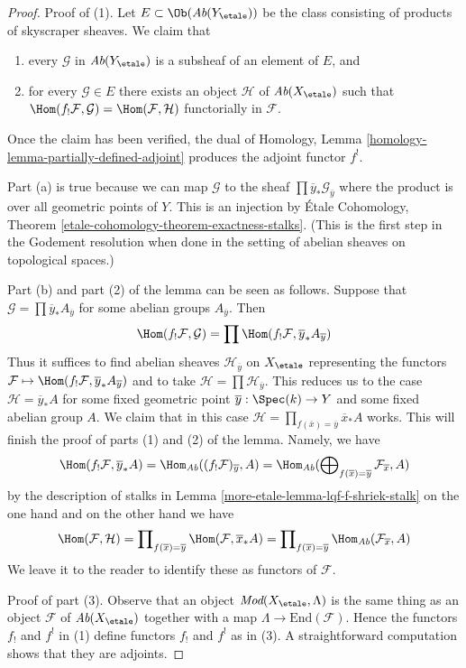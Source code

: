 \begin{proof}
Proof of (1). Let $E \subset \Ob(\textit{Ab}(Y_\etale))$ be the class
consisting of products of skyscraper sheaves. We claim that
\begin{enumerate}
\item[(a)] every $\mathcal{G}$ in $\textit{Ab}(Y_\etale)$ is a subsheaf
of an element of $E$, and
\item[(b)] for every $\mathcal{G} \in E$ there exists an object
$\mathcal{H}$ of $\textit{Ab}(X_\etale)$ such that
$\Hom(f_!\mathcal{F}, \mathcal{G}) = \Hom(\mathcal{F}, \mathcal{H})$
functorially in $\mathcal{F}$.
\end{enumerate}
Once the claim has been verified, the dual of
Homology, Lemma \ref{homology-lemma-partially-defined-adjoint}
produces the adjoint functor $f^!$.

\medskip\noindent
Part (a) is true because we can map $\mathcal{G}$ to the sheaf
$\prod \overline{y}_*\mathcal{G}_{\overline{y}}$ where the
product is over all geometric points of $Y$. This is an injection by
\'Etale Cohomology, Theorem \ref{etale-cohomology-theorem-exactness-stalks}.
(This is the first step in the Godement resolution when
done in the setting of abelian sheaves on topological spaces.)

\medskip\noindent
Part (b) and part (2) of the lemma can be seen as follows.
Suppose that $\mathcal{G} = \prod \overline{y}_*A_{\overline{y}}$
for some abelian groups $A_{\overline{y}}$. Then
$$
\Hom(f_!\mathcal{F}, \mathcal{G}) =
\prod \Hom(f_!\mathcal{F}, \overline{y}_*A_{\overline{y}})
$$
Thus it suffices to find abelian sheaves $\mathcal{H}_{\overline{y}}$
on $X_\etale$ representing the functors
$\mathcal{F} \mapsto \Hom(f_!\mathcal{F}, \overline{y}_*A_{\overline{y}})$
and to take $\mathcal{H} = \prod \mathcal{H}_{\overline{y}}$.
This reduces us to the case $\mathcal{H} = \overline{y}_*A$
for some fixed geometric point $\overline{y} : \Spec(k) \to Y$
and some fixed abelian group $A$. We claim that in this case
$\mathcal{H} = \prod_{f(\overline{x}) = \overline{y}} \overline{x}_*A$ works.
This will finish the proof of parts (1) and (2) of the lemma.
Namely, we have
$$
\Hom(f_!\mathcal{F}, \overline{y}_*A) =
\Hom_{\textit{Ab}}((f_!\mathcal{F})_{\overline{y}}, A) =
\Hom_{\textit{Ab}}(\bigoplus\nolimits_{f(\overline{x}) = \overline{y}}
\mathcal{F}_{\overline{x}}, A)
$$
by the description of stalks in
Lemma \ref{more-etale-lemma-lqf-f-shriek-stalk}
on the one hand and on the other hand we have
$$
\Hom(\mathcal{F}, \mathcal{H}) =
\prod\nolimits_{f(\overline{x}) = \overline{y}}
\Hom(\mathcal{F}, \overline{x}_*A) =
\prod\nolimits_{f(\overline{x}) = \overline{y}}
\Hom_{\textit{Ab}}(\mathcal{F}_{\overline{x}}, A)
$$
We leave it to the reader to identify these as functors of $\mathcal{F}$.

\medskip\noindent
Proof of part (3). Observe that an object $\textit{Mod}(X_\etale, \Lambda)$
is the same thing as an object $\mathcal{F}$ of $\textit{Ab}(X_\etale)$
together with a map $\Lambda \to \text{End}(\mathcal{F})$. Hence the
functors $f_!$ and $f^!$ in (1) define functors $f_!$ and $f^!$ as in (3).
A straightforward computation shows that they are adjoints.
\end{proof}

